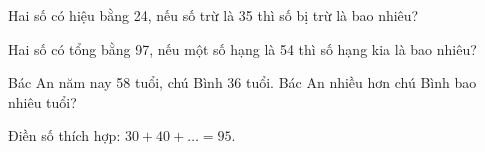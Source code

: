 \begin{ex}
Hai số có hiệu bằng 24, nếu số trừ là 35 thì số bị trừ là bao nhiêu?
\end{ex}

\begin{ex}
Hai số có tổng bằng 97, nếu một số hạng là 54 thì số hạng kia là bao nhiêu?
\end{ex}

\begin{ex}
Bác An năm nay 58 tuổi, chú Bình 36 tuổi. Bác An nhiều hơn chú Bình bao nhiêu tuổi?
\end{ex}

\begin{ex}
Điền số thích hợp: $30 + 40 + \dots = 95$.
\end{ex}
